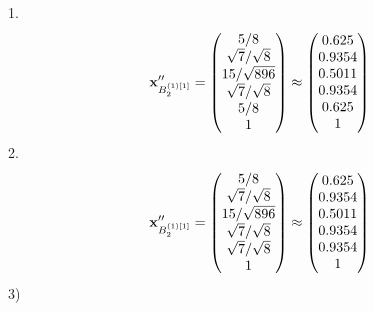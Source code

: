 \documentclass[10pt,a4paper]{article}
\begin{document}
	1.
	\[
		\bold{x}''_{B_2^{(1)[1]}} = 
		\begin{pmatrix}
			{{5}} / {{8}} \\
			{\sqrt{7}} / {\sqrt{8}} \\
			{{15}} / {\sqrt{896}} \\
			{\sqrt{7}} / {\sqrt{8}} \\
			{{5}} / {{8}} \\
			{1}{} \\
		\end{pmatrix}
		\approx
		\begin{pmatrix}
			0.625    \\
			0.9354   \\
			0.5011   \\
			0.9354   \\
			0.625    \\
			1        \\
		\end{pmatrix}
	\]
	2.
	\[
		\bold{x}''_{B_2^{(1)[1]}} = 
		\begin{pmatrix}
			{{5}} / {{8}} \\
			{\sqrt{7}} / {\sqrt{8}} \\
			{{15}} / {\sqrt{896}} \\
			{\sqrt{7}} / {\sqrt{8}} \\
			{\sqrt{7}} / {\sqrt{8}} \\
			{1}{} \\
		\end{pmatrix}
		\approx
		\begin{pmatrix}
			0.625    \\
			0.9354   \\
			0.5011   \\
			0.9354   \\
			0.9354   \\
			1        \\
		\end{pmatrix}
	\]
	3)
\end{document}
